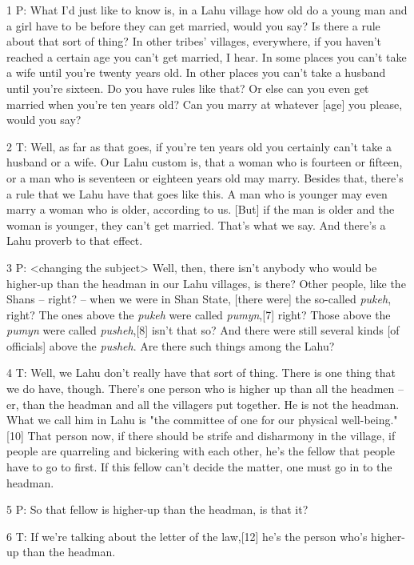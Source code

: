 
{1 P: What I'd just like to know is, in a Lahu village how old do a young
man and a girl have to be before they can get married, would you say? Is there
a rule about that sort of thing? In other tribes' villages, everywhere, if you
haven't reached a certain age you can't get married, I hear. In some places you
can't take a wife until you're twenty years old. In other places you can't take
a husband until you're sixteen. Do you have rules like that? Or else can you even
get married when you're ten years old? Can you marry at whatever [age] you please,
would you say? }

{2 T: Well, as far as that goes, if you're ten years old you certainly can't
take a husband or a wife. Our Lahu custom is, that a woman who is fourteen or fifteen,
or a man who is seventeen or eighteen years old may marry. Besides that, there's
a rule that we Lahu have that goes like this. A man who is younger may even marry
a woman who is older, according to us. [But] if the man is older and the woman
is younger, they can't get married. That's what we say. And there's a Lahu proverb
to that effect. }

{3 P: <changing the subject> Well, then, there isn't anybody
who would be higher-up than the headman in our Lahu villages, is there? Other people,
like the Shans -- right? -- when we were in Shan State, [there were] the so-called
}{\textit{pukeh}}{, right? The ones above the }{\textit{pukeh}}{
were called }{\textit{pumyn}}{,[7] right? Those above the }{\textit{pumyn}}{
were called }{\textit{pusheh}}{,[8] isn't that so? And there were
still several kinds [of officials] above the }{\textit{pusheh}}{.
Are there such things among the Lahu? }

{4 T: Well, we Lahu don't really have that sort of thing. There is one thing
that we do have, though. There's one person who is higher up than all the headmen
-- er, than the headman and all the villagers put together. He is not the headman.
What we call him in Lahu is "the committee of one for our physical well-being."[10]
That person now, if there should be strife and disharmony in the village, if people
are quarreling and bickering with each other, he's the fellow that people have
to go to first. If this fellow can't decide the matter, one must go in to the headman.}

{5 P: So that fellow is higher-up than the headman, is that it?}

{6 T: If we're talking about the letter of the law,[12] he's the person
who's higher-up than the headman.}


